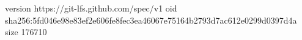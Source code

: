 version https://git-lfs.github.com/spec/v1
oid sha256:5fd046e98e83ef2e606fe8fec3ea46067e75164b2793d7ac612e0299d0397d4a
size 176710
